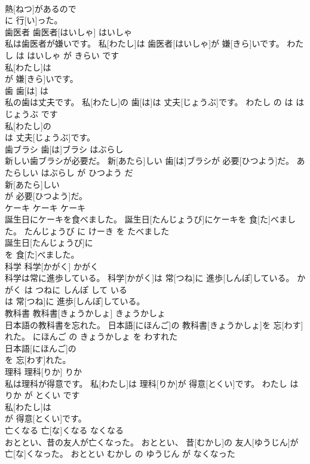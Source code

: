\documentclass[8pt]{extreport}
\begin{document}
\begin{CJK}{UTF8}{min}
\\	熱[ねつ]があるので
\\	に 行[い]った。			
\\	歯医者	歯医者[はいしゃ]	はいしゃ	
\\	私は歯医者が嫌いです。	私[わたし]は 歯医者[はいしゃ]が 嫌[きら]いです。	わたし は はいしゃ が きらい です	
\\	私[わたし]は
\\	が 嫌[きら]いです。			
\\	歯	歯[は]	は	
\\	私の歯は丈夫です。	私[わたし]の 歯[は]は 丈夫[じょうぶ]です。	わたし の は は じょうぶ です	
\\	私[わたし]の
\\	は 丈夫[じょうぶ]です。			
\\	歯ブラシ	歯[は]ブラシ	はぶらし	
\\	新しい歯ブラシが必要だ。	新[あたら]しい 歯[は]ブラシが 必要[ひつよう]だ。	あたらしい はぶらし が ひつよう だ	
\\	新[あたら]しい
\\	が 必要[ひつよう]だ。			
\\	ケーキ	ケーキ	ケーキ	
\\	誕生日にケーキを食べました。	誕生日[たんじょうび]にケーキを 食[た]べました。	たんじょうび に けーき を たべました	
\\	誕生日[たんじょうび]に
\\	を 食[た]べました。			
\\	科学	科学[かがく]	かがく	
\\	科学は常に進歩している。	科学[かがく]は 常[つね]に 進歩[しんぽ]している。	かがく は つねに しんぽ して いる	
\\	は 常[つね]に 進歩[しんぽ]している。			
\\	教科書	教科書[きょうかしょ]	きょうかしょ	
\\	日本語の教科書を忘れた。	日本語[にほんご]の 教科書[きょうかしょ]を 忘[わす]れた。	にほんご の きょうかしょ を わすれた	
\\	日本語[にほんご]の
\\	を 忘[わす]れた。			
\\	理科	理科[りか]	りか	
\\	私は理科が得意です。	私[わたし]は 理科[りか]が 得意[とくい]です。	わたし は りか が とくい です	
\\	私[わたし]は
\\	が 得意[とくい]です。			
\\	亡くなる	亡[な]くなる	なくなる	
\\	おととい、昔の友人が亡くなった。	おととい、 昔[むかし]の 友人[ゆうじん]が 亡[な]くなった。	おととい むかし の ゆうじん が なくなった	

\end{CJK}
\end{document}
